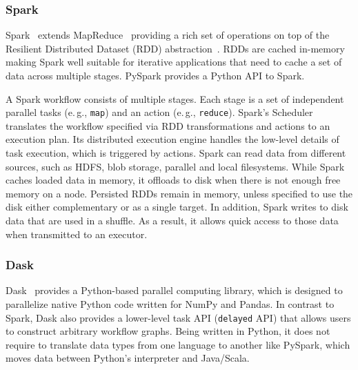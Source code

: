 
\subsubsection*{Spark}
Spark~\cite{zaharia2010spark} extends MapReduce~\cite{dean2004mapreduce} providing a rich set of operations on top of the Resilient Distributed Dataset (RDD) abstraction~\cite{zaharia2012resilient}.
RDDs are cached in-memory making Spark well suitable for iterative applications that need to cache a set of data across multiple stages.
PySpark provides a Python API to Spark.

A Spark workflow consists of multiple stages.
Each stage is a set of independent parallel tasks (e.\,g., \texttt{map}) and an action (e.\,g., \texttt{reduce}).
Spark's Scheduler translates the workflow specified via RDD transformations and actions to an execution plan.
Its distributed execution engine handles the low-level details of task execution, which is triggered by actions.
Spark can read data from different sources, such as HDFS, blob storage, parallel and local filesystems.
While Spark caches loaded data in memory, it offloads to disk when there is not enough free memory on a node.
Persisted RDDs remain in memory, unless specified to use the disk either complementary or as a single target.
In addition, Spark writes to disk data that are used in a shuffle.
As a result, it allows quick access to those data when transmitted to an executor.

\subsubsection*{Dask}
Dask~\cite{rocklin2015dask} provides a Python-based parallel computing library, which is designed to parallelize native Python code written for NumPy and Pandas.
In contrast to Spark, Dask also provides a lower-level task API (\texttt{delayed} API) that allows users to construct arbitrary workflow graphs.
Being written in Python, it does not require to translate data types from one language to another like PySpark, which moves data between Python's interpreter and Java/Scala.

